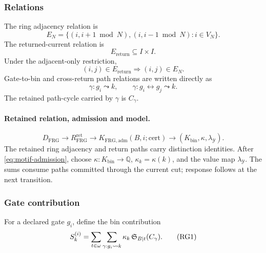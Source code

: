 \subsubsection{Relations}\label{subsec:frg-relations}
The ring adjacency relation is
\begin{equation}
E_N=
\{(i,i+1\bmod N),(i,i-1\bmod N):i\in V_N\}.
\label{eq:frg-ring-adjacency}
\end{equation}
The returned-current relation is
\begin{equation}
E_{\mathrm{return}}\subseteq I\times I.
\label{eq:frg-return-relation}
\end{equation}
Under the adjacent-only restriction,
\begin{equation}
(i,j)\in E_{\mathrm{return}}
\Rightarrow
(i,j)\in E_N.
\label{eq:frg-adjacent-only-condition}
\end{equation}
Gate-to-bin and cross-return path relations are written directly as
\[
\gamma:g_i\leadsto k,
\qquad
\gamma:g_i\leftrightarrow g_j\leadsto k.
\]
The retained path-cycle carried by \(\gamma\) is \(C_\gamma\).

\paragraph{Retained relation, admission and model.}
\begin{equation}
D_{\mathrm{FRG}}\longrightarrow R^{\mathrm{ret}}_{\mathrm{FRG}}
\longrightarrow K_{\mathrm{FRG,adm}}(B,i;\mathrm{cert})
\longrightarrow(K_{\mathrm{bin}},\kappa,\lambda_{\mathcal Y}).
\label{eq:frg-admission-order}
\end{equation}
The retained ring adjacency and return paths carry distinction identities.
After \eqref{eq:motif-admission}, choose
\(\kappa:K_{\mathrm{bin}}\to\mathbb Q\), \(\kappa_k=\kappa(k)\), and the
value map \(\lambda_{\mathcal Y}\). The sums consume paths committed through
the current cut; response follows at the next transition.

\subsubsection{Gate contribution}\label{subsec:frg-gate-contribution}
For a declared gate \(g_i\), define the bin contribution
\begin{equation*}
S_k^{(i)}
=
\sum_{t\in\omega}
\sum_{\gamma:g_i\leadsto k}
\kappa_k\,
\mathfrak S_{B|t}(C_\gamma).
\tag{RG1}\label{eq:frg-gate-contribution}
\end{equation*}


